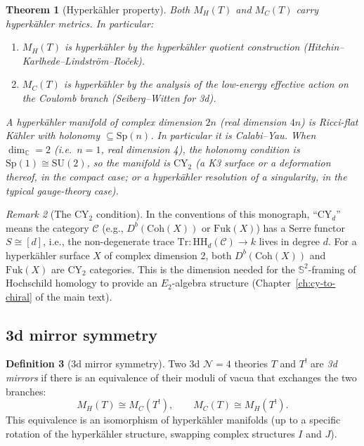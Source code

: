 \documentclass[11pt]{article}
\newtheorem{theorem}{Theorem}[section]
\theoremstyle{definition}
\newtheorem{definition}[theorem]{Definition}
\theoremstyle{remark}
\newtheorem{remark}[theorem]{Remark}
\newcommand{\CY}{\mathrm{CY}}
\newcommand{\HH}{\mathrm{HH}}
\newcommand{\Coh}{\mathrm{Coh}}
\newcommand{\Fuk}{\mathrm{Fuk}}
\newcommand{\Tr}{\mathrm{Tr}}
\newcommand{\Etwo}{E_2}
\newcommand{\cC}{\mathcal{C}}
\newcommand{\cN}{\mathcal{N}}
\begin{document}
\begin{theorem}[Hyperk\"ahler property]
\label{thm:hk-branches}
Both $M_H(T)$ and $M_C(T)$ carry hyperk\"ahler metrics. In particular:
\begin{enumerate}[label=(\alph*)]
 \item $M_H(T)$ is hyperk\"ahler by the hyperk\"ahler quotient construction (Hitchin--Karlhede--Lindstr\"om--Ro\v{c}ek).
 \item $M_C(T)$ is hyperk\"ahler by the analysis of the low-energy effective action on the Coulomb branch (Seiberg--Witten for 3d).
\end{enumerate}
A hyperk\"ahler manifold of complex dimension $2n$ (real dimension $4n$) is Ricci-flat K\"ahler with holonomy $\subseteq \mathrm{Sp}(n)$. In particular it is Calabi--Yau. When $\dim_{\mathbb{C}} = 2$ (i.e.\ $n = 1$, real dimension 4), the holonomy condition is $\mathrm{Sp}(1) \cong \mathrm{SU}(2)$, so the manifold is $\CY_2$ (a K3 surface or a deformation thereof, in the compact case; or a hyperk\"ahler resolution of a singularity, in the typical gauge-theory case).
\end{theorem}

\begin{remark}[The $\CY_2$ condition]
\label{rem:cy2}
In the conventions of this monograph, ``$\CY_d$'' means the category $\cC$ (e.g., $D^b(\Coh(X))$ or $\Fuk(X)$) has a Serre functor $S \cong [d]$, i.e., the non-degenerate trace $\Tr \colon \HH_d(\cC) \to k$ lives in degree $d$. For a hyperk\"ahler surface $X$ of complex dimension 2, both $D^b(\Coh(X))$ and $\Fuk(X)$ are $\CY_2$ categories. This is the dimension needed for the $\mathbb{S}^2$-framing of Hochschild homology to provide an $\Etwo$-algebra structure (Chapter~\ref*{ch:cy-to-chiral} of the main text).
\end{remark}

\subsection{3d mirror symmetry}

\begin{definition}[3d mirror symmetry]
\label{def:3d-mirror}
Two 3d $\cN=4$ theories $T$ and $T^!$ are \emph{3d mirrors} if there is an equivalence of their moduli of vacua that exchanges the two branches:
\[
 M_H(T) \cong M_C(T^!), \qquad M_C(T) \cong M_H(T^!).
\]
This equivalence is an isomorphism of hyperk\"ahler manifolds (up to a specific rotation of the hyperk\"ahler structure, swapping complex structures $I$ and $J$).
\end{definition}
\end{document}
